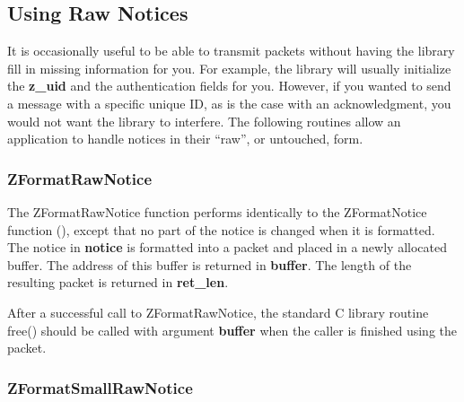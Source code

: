 %
\subsection{Using Raw Notices}
\label{raw-notices}

It is occasionally useful to be able to transmit packets without
having the library fill in missing information for you.  For example,
the library will usually initialize the {\bf z_uid} and the
authentication fields for you.  However, if you wanted to send a
message with a specific unique ID, as is the case with an
acknowledgment, you would not want the library to interfere.  The
following routines allow an application to handle notices in their
``raw'', or untouched, form.

\subsubsection{ZFormatRawNotice}
\label{ZFormatRawNotice}

\etemplate
{}

The ZFormatRawNotice function performs identically to the
ZFormatNotice function (), except that no part of
the notice is changed when it is formatted.  The notice in {\bf
notice} is formatted into a packet and placed in a newly allocated
buffer. The address of this buffer is returned in {\bf *buffer}.
The length of the resulting packet is returned in {\bf *ret_len}.

After a successful call to ZFormatRawNotice, the standard C library routine
free() should be called with argument {\bf *buffer} when the caller is
finished using the packet.

\subsubsection{ZFormatSmallRawNotice}
\label{ZFormatSmallRawNotice}

\etemplate
{}

